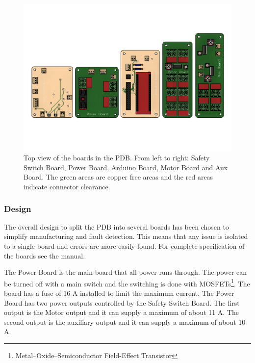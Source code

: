 \begin{figure}[ht!]
\centering 
\includegraphics[width=1\textwidth]{Electronics/bulterpdb.pdf}
\caption{Top view of the boards in the PDB. From left to right: Safety Switch Board, Power Board, Arduino Board, Motor Board and Aux Board. The green areas are copper free areas and the red areas indicate connector clearance.}
\label{fig:butlerpdb}
\end{figure}

\subsubsection{Design}
The overall design to split the PDB into several boards has been chosen to simplify manufacturing and fault detection. This means that any issue is isolated to a single board and errors are more easily found. For complete specification of the boards see the manual. 

The Power Board is the main board that all power runs through. The power can be turned off with a main switch and the switching is done with MOSFETs\footnote{Metal–Oxide–Semiconductor Field-Effect Transistor}. The board has a fuse of 16 A installed to limit the maximum current. The Power Board has two power outputs controlled by the Safety Switch Board. The first output is the Motor output and it can supply a maximum of about 11 A. The second output is the auxiliary output and it can supply a maximum of about 10 A. 

